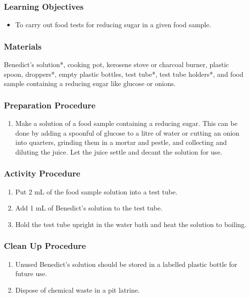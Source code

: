 \subsubsection*{Learning Objectives}
\begin{itemize}
\item{To carry out food tests for reducing sugar in a given food sample.}
\end{itemize}

\subsubsection*{Materials}
Benedict's solution*, cooking pot, kerosene stove or charcoal burner, plastic spoon, droppers*, empty plastic bottles, test tube*, test tube holders*, and food sample containing a reducing sugar like glucose or onions.

\subsubsection*{Preparation Procedure}
\begin{enumerate}
\item{Make a solution of a food sample containing a reducing sugar. This can be done by adding a spoonful of glucose to a litre of water or cutting an onion into quarters, grinding them in a mortar and pestle, and collecting and diluting the juice. Let the juice settle and decant the solution for use.}
\end{enumerate}

\subsubsection*{Activity Procedure}
\begin{enumerate}
\item{Put 2 mL of the food sample solution into a test tube.}
\item{Add 1 mL of Benedict's solution to the test tube.}
\item{Hold the test tube upright in the water bath and heat the solution to boiling.}
\end{enumerate}

\subsubsection*{Clean Up Procedure}
\begin{enumerate}
\item{Unused Benedict's solution should be stored in a labelled plastic bottle for future use.}
\item{Dispose of chemical waste in a pit latrine.}
\end{enumerate}


